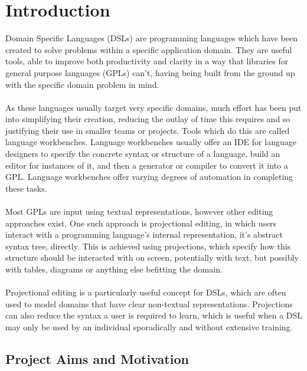 \documentclass{article}
\begin{document}

\clearpage
\tableofcontents
\clearpage

\section{Introduction}

Domain Specific Languages (DSLs) are programming languages which have been created to solve problems within a specific application domain. They are useful tools, able to improve both productivity and clarity in a way that libraries for general purpose languages (GPLs) can't, having being built from the ground up with the specific domain problem in mind. 
\\
\\
As these languages usually target very specific domains, much effort has been put into simplifying their creation, reducing the outlay of time this requires and so justifying their use in smaller teams or projects. Tools which do this are called language workbenches. Language workbenches usually offer an IDE for language designers to specify the concrete syntax or structure of a language, build an editor for instances of it, and then a generator or compiler to convert it into a GPL. Language workbenches offer varying degrees of automation in completing these tasks.
\\
\\
Most GPLs are input using textual representations, however other editing approaches exist. One such approach is projectional editing, in which users interact with a programming language's internal representation, it's abstract syntax tree, directly. This is achieved using projections, which specify how this structure should be interacted with on screen, potentially with text, but possibly with tables, diagrams or anything else befitting the domain. 
\\
\\
Projectional editing is a particularly useful concept for DSLs, which are often used to model domains that have clear non-textual representations. Projections can also reduce the syntax a user is required to learn, which is useful when a DSL may only be used by an individual sporadically and without extensive training.

\subsection{Project Aims and Motivation}
\end{document}
